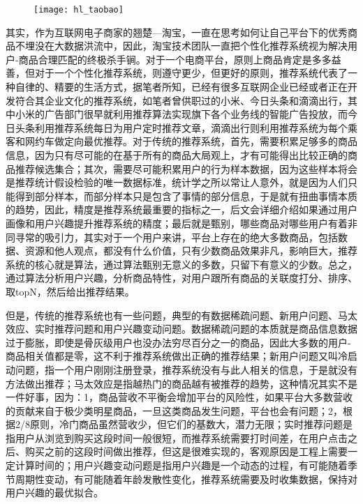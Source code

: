 	\begin{figure}
		\centering
		\texttt{[image: hl\_taobao]}
		\label{fig:hl_taobao}
	\end{figure}
	其实，作为互联网电子商家的翘楚---淘宝，一直在思考如何让自己平台下的优秀商品不埋没在大数据洪流中，因此，淘宝技术团队一直把个性化推荐系统视为解决用户-商品合理匹配的终极杀手锏。对于一个电商平台，原则上商品肯定是多多益善，但对于一个个性化推荐系统，则遵守更少，但更好的原则，推荐系统代表了一种自律的、精要的生活方式，据笔者所知，已经有很多互联网企业已经或者正在开发符合其企业文化的推荐系统，如笔者曾供职过的小米、今日头条和滴滴出行，其中小米的广告部门很早就利用推荐算法实现旗下各个业务线的智能广告投放，而今日头条利用推荐系统每日为用户定时推荐文章，滴滴出行则利用推荐系统为每个乘客和网约车做定向最优推荐。对于传统的推荐系统，首先，需要积累足够多的商品信息，因为只有尽可能的在基于所有的商品大局观上，才有可能得出比较正确的商品推荐候选集合；其次，需要尽可能积累用户的行为样本数据，因为这些样本将会是推荐统计假设检验的唯一数据标准，统计学之所以常让人意外，就是因为人们只能得到部分样本，而部分样本只是包含了事情的部分信息，于是就有扭曲事情本质的趋势，因此，精度是推荐系统最重要的指标之一，后文会详细介绍如果通过用户画像和用户兴趣提升推荐系统的精度；最后就是甄别，哪些商品对哪些用户有着非同寻常的吸引力，其实对于一个用户来讲，平台上存在的绝大多数商品，包括数据、资源和他人观点，都没有什么价值，只有少数商品效果非凡，影响巨大，推荐系统的核心就是算法\citep{date-mining}，通过算法甄别无意义的多数，只留下有意义的少数。总之，通过算法分析用户兴趣，分析商品特性，对用户跟所有商品的关联度打分、排序、取topN，然后给出推荐结果。

	但是，传统的推荐系统也有一些问题，典型的有数据稀疏问题、新用户问题、马太效应、实时推荐问题和用户兴趣变动问题。数据稀疏问题的本质就是商品信息数据过于膨胀，即使是骨灰级用户也没办法穷尽百分之一的商品，因此大多数的用户-商品相关值都是零，这不利于推荐系统做出正确的推荐结果；新用户问题又叫冷启动问题，指一个用户刚刚注册登录，推荐系统没有与此人相关的信息，于是就没有方法做出推荐；马太效应是指越热门的商品越有被推荐的趋势，这种情况其实不是一件好事，因为：1，商品营收不平衡会增加平台的风险性，如果平台大多数营收的贡献来自于极少类明星商品，一旦这类商品发生问题，平台也会有问题；2，根据2/8原则，冷门商品虽然营收少，但它们的基数大，潜力无限；实时推荐问题是指用户从浏览到购买这段时间一般很短，而推荐系统需要打时间差，在用户点击之后、购买之前的这段时间做出推荐，但这是很难实现的，客观原因是工程上需要一定计算时间的；用户兴趣变动问题是指用户兴趣是一个动态的过程，有可能随着季节周期性变动，有可能随着年龄发散性变化，推荐系统需要及时收集数据，保持对用户兴趣的最优拟合。

